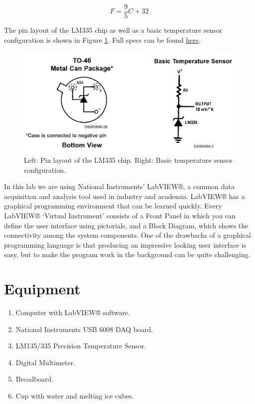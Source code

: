 \documentclass[11pt,letterpaper]{article}
\begin{document}
\begin{equation}
F = \dfrac{9}{5}C + 32
\end{equation}

The pin layout of the LM335 chip as well as a basic temperature sensor configuration is shown in Figure \ref{fig:Lab8_TemperatureMeasurementUsingLabVIEW_LM335PinLayout_TemperatureMeasurement}. Full specs can be found \href{http://abe-research.illinois.edu/Faculty/grift/ABE425_2015/Specs/LM335.pdf}{here}.

\begin{figure}
\centering
\includegraphics[width=1\linewidth]{Lab8_TemperatureMeasurementUsingLabVIEW_LM335PinLayout_TemperatureMeasurement}
\caption{Left: Pin layout of the LM335 chip. Right: Basic temperature sensor configuration.}
\label{fig:Lab8_TemperatureMeasurementUsingLabVIEW_LM335PinLayout_TemperatureMeasurement}
\end{figure}

In this lab we are using National Instruments’ LabVIEW®, a common data acquisition and analysis tool used in industry and academia. LabVIEW® has a graphical programming environment that can be learned quickly. Every LabVIEW® ‘Virtual Instrument’ consists of a Front Panel in which you can define the user interface using pictorials, and a Block Diagram, which shows the connectivity among the system components. One of the drawbacks of a graphical programming language is that producing an impressive looking user interface is easy, but to make the program work in the background can be quite challenging. 

\section{Equipment}

\begin{enumerate}
\item Computer with LabVIEW® software.
\item National Instruments USB 6008 DAQ board.
\item LM135/335 Precision Temperature Sensor.
\item Digital Multimeter.
\item Breadboard.
\item Cup with water and melting ice cubes.
\end{enumerate}
\end{document}
